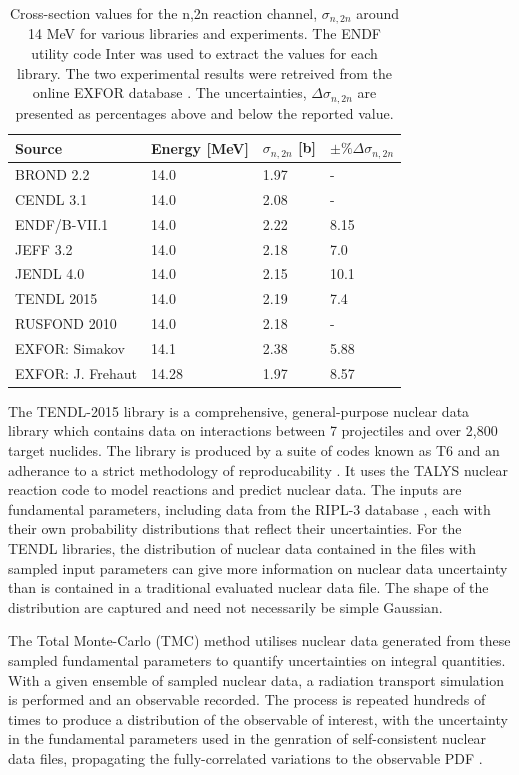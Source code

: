 \begin{table}[ht]
  \footnotesize
  \centering
  \begin{tabularx}{\textwidth}{XXXX}
    \toprule
    Source & Energy [MeV] & $\sigma_{n,2n}$ [b] & $\pm\%\Delta\sigma_{n,2n}$ \\
    \midrule
    BROND 2.2 & 14.0 & 1.97 & - \\
    CENDL 3.1 & 14.0 & 2.08 & - \\
    ENDF/B-VII.1 & 14.0 & 2.22 & 8.15 \\
    JEFF 3.2 & 14.0 & 2.18 & 7.0 \\
    JENDL 4.0 & 14.0 & 2.15 & 10.1 \\
    TENDL 2015 & 14.0 & 2.19 & 7.4 \\
    RUSFOND 2010 & 14.0 & 2.18 & - \\
    EXFOR: Simakov & 14.1 & 2.38 & 5.88 \\
    EXFOR: J. Frehaut & 14.28 & 1.97 & 8.57 \\
    \bottomrule
  \end{tabularx}
  \caption{Cross-section values for the n,2n reaction channel, $\sigma_{n,2n}$ around 14 MeV for various libraries and experiments. The ENDF utility code Inter \cite{inter} was used to extract the values for each library. The two experimental results were retreived from the online EXFOR database \cite{exfor2017}. The uncertainties, $\Delta\sigma_{n,2n}$ are presented as percentages above and below the reported value.}
  \label{tab:lead_by_lib}
\end{table}

The TENDL-2015 library is a comprehensive, general-purpose nuclear data library which contains data on interactions between 7 projectiles and over 2,800 target nuclides. The library is produced by a suite of codes known as T6 and an adherance to a strict methodology of reproducability \cite{Rochman2016}. It uses the TALYS nuclear reaction code to model reactions and predict nuclear data. The inputs are fundamental parameters, including data from the RIPL-3 database \cite{RIPL3}, each with their own probability distributions that reflect their uncertainties. For the TENDL libraries, the distribution of nuclear data contained in the files with sampled input parameters can give more information on nuclear data uncertainty than is contained in a traditional evaluated nuclear data file. The shape of the distribution are captured and need not necessarily be simple Gaussian.

The Total Monte-Carlo (TMC) method utilises nuclear data generated from these sampled fundamental parameters to quantify uncertainties on integral quantities. With a given ensemble of sampled nuclear data, a radiation transport simulation is performed and an observable recorded. The process is repeated hundreds of times to produce a distribution of the observable of interest, with the uncertainty in the fundamental parameters used in the genration of self-consistent nuclear data files, propagating the fully-correlated variations to the observable PDF \cite{Koning2008}.

